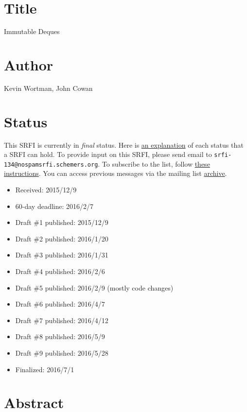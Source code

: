 \section{Title}\label{title}

Immutable Deques

\section{Author}\label{author}

Kevin Wortman, John Cowan

\section{Status}\label{status}

This SRFI is currently in \emph{final} status. Here is
\href{http://srfi.schemers.org/srfi-process.html}{an explanation} of
each status that a SRFI can hold. To provide input on this SRFI, please
send email to \texttt{srfi-134@nospamsrfi.schemers.org}. To subscribe to
the list, follow
\href{http://srfi.schemers.org/srfi-list-subscribe.html}{these
instructions}. You can access previous messages via the mailing list
\href{http://srfi-email.schemers.org/srfi-134}{archive}.

\begin{itemize}
\tightlist
\item
  Received: 2015/12/9
\item
  60-day deadline: 2016/2/7
\item
  Draft \#1 published: 2015/12/9
\item
  Draft \#2 published: 2016/1/20
\item
  Draft \#3 published: 2016/1/31
\item
  Draft \#4 published: 2016/2/6
\item
  Draft \#5 published: 2016/2/9 (mostly code changes)
\item
  Draft \#6 published: 2016/4/7
\item
  Draft \#7 published: 2016/4/12
\item
  Draft \#8 published: 2016/5/9
\item
  Draft \#9 published: 2016/5/28
\item
  Finalized: 2016/7/1
\end{itemize}

\section{Abstract}\label{abstract}

